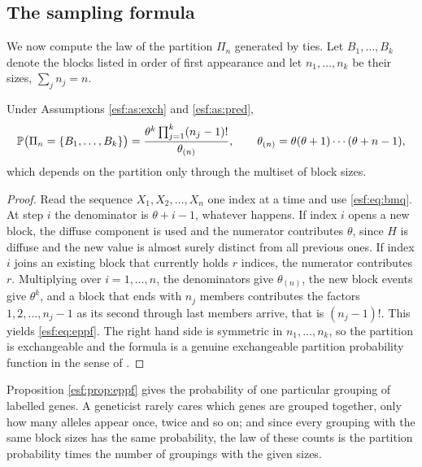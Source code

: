 \subsection{The sampling formula}
\label{esf:sec:esf}

We now compute the law of the partition $\Pi_n$ generated by ties. Let
$B_1, \dots, B_k$ denote the blocks listed in order of first appearance and let
$n_1, \dots, n_k$ be their sizes, $\sum_j n_j = n$.

\begin{proposition}
\label{esf:prop:eppf}
Under Assumptions \ref{esf:as:exch} and \ref{esf:as:pred},
\begin{equation}
\mathbb{P}\bigl( \Pi_n = \{B_1,\dots,B_k\} \bigr)
= \frac{\theta^{k} \prod_{j=1}^{k} (n_j - 1)!}{\theta_{(n)}},
\qquad \theta_{(n)} = \theta(\theta+1)\cdots(\theta+n-1),
\label{esf:eq:eppf}
\end{equation}
which depends on the partition only through the multiset of block sizes.
\end{proposition}

\begin{proof}
Read the sequence $X_1, X_2, \dots, X_n$ one index at a time and use \eqref{esf:eq:bmq}.
At step $i$ the denominator is $\theta + i - 1$, whatever happens. If index $i$ opens a
new block, the diffuse component is used and the numerator contributes $\theta$, since
$H$ is diffuse and the new value is almost surely distinct from all previous ones. If
index $i$ joins an existing block that currently holds $r$ indices, the numerator
contributes $r$. Multiplying over $i = 1, \dots, n$, the denominators give
$\theta_{(n)}$, the new block events give $\theta^{k}$, and a block that ends with
$n_j$ members contributes the factors $1, 2, \dots, n_j - 1$ as its second through
last members arrive, that is $(n_j - 1)!$. This yields \eqref{esf:eq:eppf}. The right hand
side is symmetric in $n_1, \dots, n_k$, so the partition is exchangeable and the
formula is a genuine exchangeable partition probability function in the sense of
\citet{esf:pitman1995}.
\end{proof}

Proposition \ref{esf:prop:eppf} gives the probability of one particular grouping of
labelled genes. A geneticist rarely cares which genes are grouped together, only how
many alleles appear once, twice and so on; and since every grouping with the same
block sizes has the same probability, the law of these counts is the partition
probability times the number of groupings with the given sizes.

